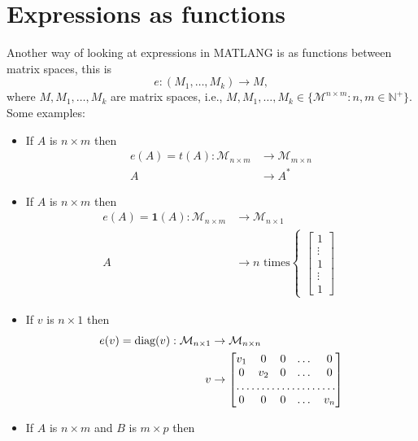 \section{Expressions as functions}

Another way of looking at expressions in MATLANG is as functions between matrix spaces, this is $$e:(M_1, \ldots, M_k)\rightarrow M,$$ where $M,M_1,\ldots, M_k$ are matrix spaces, i.e., $M,M_1,\ldots, M_k\in\lbrace\mathcal{M}^{n\times m}: n,m\in\mathbb{N}^+\rbrace$. \\

Some examples:

\begin{itemize}
	\item If $A$ is $n\times m$ then 
		\begin{align*}
			e(A)=t(A):\mathcal{M}_{n\times m}&\rightarrow \mathcal{M}_{m\times n} \\
			A&\rightarrow A^*
		\end{align*}
	\item If $A$ is $n\times m$ then 
		\begin{align*}
			e(A)=\mathbf{1}(A):\mathcal{M}_{n\times m}&\rightarrow \mathcal{M}_{n\times 1} \\
			A&\rightarrow n\text{ times}\begin{cases}\begin{bmatrix}
    1 \\
    \vdots \\
    1 \\
    \vdots \\
    1
\end{bmatrix}\end{cases}
		\end{align*}
	\item If $v$ is $n\times 1$ then 
		\begin{align*}
			e(v)=\text{diag}(v):\mathcal{M}_{n\times 1}&\rightarrow \mathcal{M}_{n\times n} \\
			v&\rightarrow \begin{bmatrix}
			    v_{1}       & 0 & 0 & \dots & 0 \\
			    0       & v_{2} & 0 & \dots & 0 \\
			    \hdotsfor{5} \\
			    0       & 0 & 0 & \dots & v_{n}
			\end{bmatrix}
		\end{align*}
	\item If $A$ is $n\times m$ and $B$ is $m\times p$ then 
		\begin{align*}

\end{align*}
\end{itemize}
